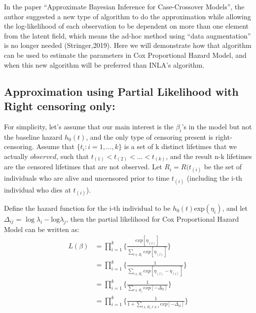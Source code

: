 \documentclass[]{article}
\begin{document}
In the paper ``Approximate Bayesian Inference for Case-Crossover
Models'', the author suggested a new type of algorithm to do the
approximation while allowing the log-likelihood of each observation to
be dependent on more than one element from the latent field, which means
the ad-hoc method using ``data augmentation'' is no longer needed
(Stringer,2019). Here we will demonstrate how that algorithm can be used
to estimate the parameters in Cox Proportional Hazard Model, and when
this new algorithm will be preferred than INLA's algorithm.

\hypertarget{approximation-using-partial-likelihood-with-right-censoring-only}{%
\subsection{Approximation using Partial Likelihood with Right censoring
only:}\label{approximation-using-partial-likelihood-with-right-censoring-only}}

For simplicity, let's assume that our main interest is the \(\beta_i\)'s
in the model but not the baseline hazard \(h_0(t)\), and the only type
of censoring present is right-censoring. Assume that
\(\{t_i:i=1,...,k\}\) is a set of k distinct lifetimes that we actually
\(observed\), such that \(t_{(1)} < t_{(2)} < ... <t_{(k)}\), and the
result n-k lifetimes are the censored lifetimes that are not observed.
Let \(R_i = R(t_{(i)}\) be the set of individuals who are alive and
uncensored prior to time \(t_{(i)}\) (including the i-th individual who
dies at \(t_{(i)}\)).

Define the hazard function for the i-th individual to be
\(h_0(t)\text{exp}(\eta_i)\), and let \(\Delta_{ij}\) =
\(\log\lambda_i -\text{log} \lambda_j\), then the partial likelihood for
Cox Proportional Hazard Model can be written as:
\begin{equation}\begin{aligned}\label{eqn:partial}
L(\beta) &= \prod_{i=1}^{k} \bigg\{\frac{exp[\eta_{(i)}]}{{\sum_{l\in R_i}^{}exp[\eta_{(l)}]}}\bigg \} \\
         &= \prod_{i=1}^{k} \bigg\{\frac{1}{{\sum_{l\in R_i}^{}exp[\eta_{(l)}-\eta_{(i)}]}}\bigg \} \\
         &= \prod_{i=1}^{k} \bigg\{\frac{1}{{\sum_{l\in R_i}^{}exp[-\Delta_{il}]}}\bigg \} \\
         &= \prod_{i=1}^{k} \bigg\{\frac{1}{{1 + \sum_{l\in R_i , l \neq i}^{}exp[-\Delta_{il}]}}\bigg \} \\
\end{aligned}\end{equation}
\end{document}
